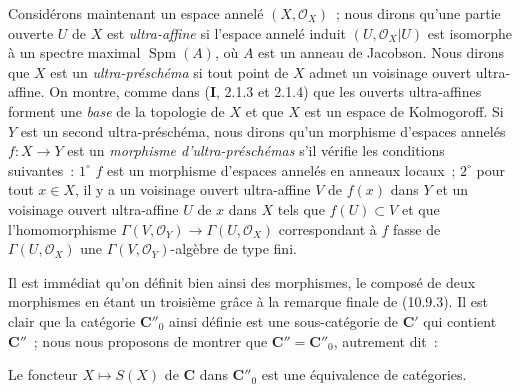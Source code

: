 
\begin{env}[10.9.5]
\label{IV.10.9.5-fr}
Considérons maintenant un espace annelé $(X,\mathcal O_X)$~; nous dirons qu'une
partie ouverte $U$ de $X$ est \emph{ultra-affine} si l'espace annelé induit
$(U,\mathcal O_X|U)$ est isomorphe à un spectre maximal
$\operatorname{Spm}(A)$, où $A$ est un anneau de Jacobson. Nous dirons que $X$
est un \emph{ultra-préschéma} si tout point de $X$ admet un voisinage ouvert
ultra-affine. On montre, comme dans (\textbf I, 2.1.3 et 2.1.4) que les ouverts
ultra-affines forment une \emph{base} de la topologie de $X$ et que $X$ est un
espace de Kolmogoroff. Si $Y$ est un second ultra-préschéma, nous dirons qu'un
morphisme d'espaces annelés $f:X\to Y$ est un \emph{morphisme
d'ultra-préschémas} s'il vérifie les conditions suivantes~: $1^\circ$ $f$ est
un morphisme d'espaces annelés en anneaux locaux~; $2^\circ$ pour tout $x\in X$,
il y a un voisinage ouvert ultra-affine $V$ de $f(x)$ dans $Y$ et un voisinage
ouvert ultra-affine $U$ de $x$ dans $X$ tels que $f(U)\subset V$ et que
l'homomorphisme
$\Gamma(V,\mathcal O_Y)\to\Gamma(U,\mathcal O_X)$ correspondant à $f$ fasse
de $\Gamma(U,\mathcal O_X)$ une $\Gamma(V,\mathcal O_Y)$-algèbre de type fini.

Il est immédiat qu'on définit bien ainsi des morphismes, le composé de deux
morphismes en étant un troisième grâce à la remarque finale de (10.9.3). Il
est clair que la catégorie $\mathbf C''_0$ ainsi définie est une sous-catégorie
de $\mathbf C'$ qui contient $\mathbf C''$~; nous nous proposons de montrer que
$\mathbf C''=\mathbf C''_0$, autrement dit~:
\end{env}

\begin{proposition}[10.9.6]
\label{IV.10.9.6-fr}
Le foncteur $X\mapsto S(X)$ de $\mathbf C$ dans $\mathbf C''_0$ est une
équivalence de catégories.
\end{proposition}

